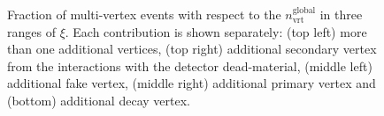 \begin{figure}[h!]
\begin{subfigure}{.47\textwidth}
	\end{subfigure}
	\begin{minipage}{.47\textwidth}
			\caption{Fraction of multi-vertex events  with respect to the $n_\textrm{vrt}^\textrm{global}$ in three ranges of $\xi$. Each contribution is shown separately: (top left) more than one additional vertices, (top right) additional secondary vertex from the interactions with the detector dead-material, (middle left) additional fake vertex, (middle right) additional primary vertex and (bottom) additional decay vertex.}
			\label{fig:vertexVeto}
	\end{minipage}
\end{figure}


